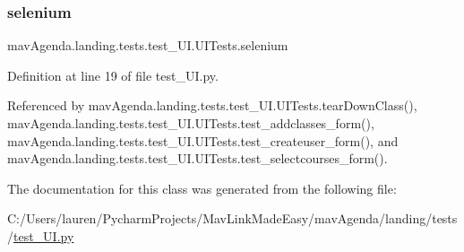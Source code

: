 \subsubsection{\texorpdfstring{selenium}{selenium}}
{\footnotesize\ttfamily mav\+Agenda.\+landing.\+tests.\+test\+\_\+\+U\+I.\+U\+I\+Tests.\+selenium}



Definition at line 19 of file test\+\_\+\+U\+I.\+py.



Referenced by mav\+Agenda.\+landing.\+tests.\+test\+\_\+\+U\+I.\+U\+I\+Tests.\+tear\+Down\+Class(), mav\+Agenda.\+landing.\+tests.\+test\+\_\+\+U\+I.\+U\+I\+Tests.\+test\+\_\+addclasses\+\_\+form(), mav\+Agenda.\+landing.\+tests.\+test\+\_\+\+U\+I.\+U\+I\+Tests.\+test\+\_\+createuser\+\_\+form(), and mav\+Agenda.\+landing.\+tests.\+test\+\_\+\+U\+I.\+U\+I\+Tests.\+test\+\_\+selectcourses\+\_\+form().



The documentation for this class was generated from the following file\+:\begin{DoxyCompactItemize}
\item 
C\+:/\+Users/lauren/\+Pycharm\+Projects/\+Mav\+Link\+Made\+Easy/mav\+Agenda/landing/tests/\mbox{\hyperlink{test__UI_8py}{test\+\_\+\+U\+I.\+py}}\end{DoxyCompactItemize}
